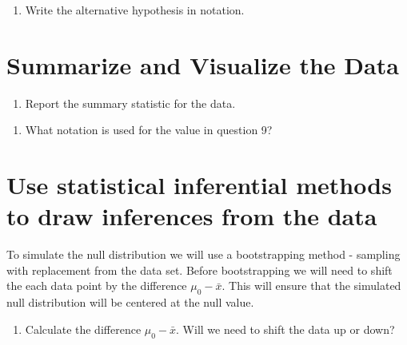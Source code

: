 \documentclass[
]{report}
\providecommand{\tightlist}{%
  \setlength{\itemsep}{0pt}\setlength{\parskip}{0pt}}
\begin{document}
\vspace{1in}

\begin{enumerate}
\def\labelenumi{\arabic{enumi}.}
\setcounter{enumi}{7}
\tightlist
\item
  Write the alternative hypothesis in notation.
\end{enumerate}

\vspace{1in}

\hypertarget{summarize-and-visualize-the-data}{%
\section{Summarize and Visualize the Data}\label{summarize-and-visualize-the-data}}

\begin{enumerate}
\def\labelenumi{\arabic{enumi}.}
\setcounter{enumi}{8}
\tightlist
\item
  Report the summary statistic for the data.
\end{enumerate}

\vspace{0.5in}

\begin{enumerate}
\def\labelenumi{\arabic{enumi}.}
\setcounter{enumi}{9}
\tightlist
\item
  What notation is used for the value in question 9?
\end{enumerate}

\vspace{0.5in}

\hypertarget{use-statistical-inferential-methods-to-draw-inferences-from-the-data}{%
\section{Use statistical inferential methods to draw inferences from the data}\label{use-statistical-inferential-methods-to-draw-inferences-from-the-data}}

To simulate the null distribution we will use a bootstrapping method - sampling with replacement from the data set. Before bootstrapping we will need to shift the each data point by the difference \(\mu_0 - \bar{x}\). This will ensure that the simulated null distribution will be centered at the null value.

\begin{enumerate}
\def\labelenumi{\arabic{enumi}.}
\setcounter{enumi}{10}
\tightlist
\item
  Calculate the difference \(\mu_0 - \bar{x}\). Will we need to shift the data up or down?
\end{enumerate}
\end{document}
